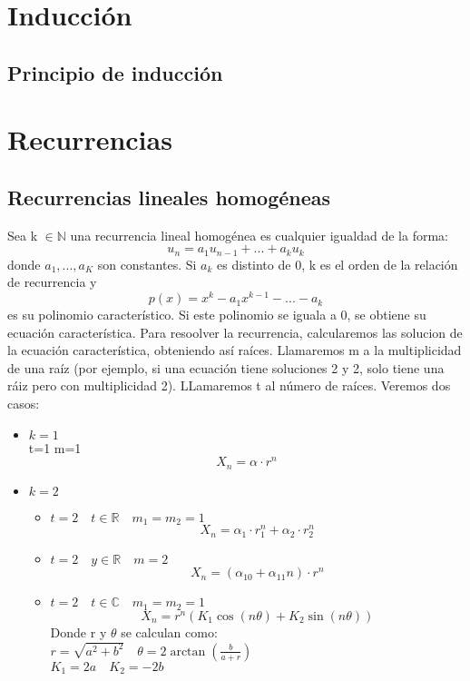 \documentclass[a4paper]{article}
\title {\fbox{\Huge{\textbf{Resumen de lógica}}}}
\author {\fbox{Mapachana}}
\begin{document}
\maketitle


\section{Inducción}
\subsection{Principio de inducción}

\section{Recurrencias}
\subsection{Recurrencias lineales homogéneas}
\large{Sea} k $\in \mathbb{N}$ una recurrencia lineal homogénea es cualquier igualdad de la forma:
$$u_n=a_1u_{n-1}+...+a_ku_k$$
donde $a_1,...,a_K$ son constantes. Si $a_k$ es distinto de 0, k es el orden de la relación de recurrencia y
$$p(x)=x^k-a_1x^{k-1}-...-a_k$$
es su polinomio característico. Si este polinomio se iguala a 0, se obtiene su ecuación característica.
Para resoolver la recurrencia, calcularemos las solucion de la ecuación característica, obteniendo así raíces. Llamaremos m a la multiplicidad de una raíz (por ejemplo, si una ecuación tiene soluciones 2 y 2, solo tiene una ráiz pero con multiplicidad 2). LLamaremos t al número de raíces.
Veremos dos casos:
\begin{itemize}
\item $k=1$\\
t=1 m=1
$$X_n=\alpha\cdot r^n$$
\item $k=2$
\begin{itemize}
\item $t=2 \quad t\in\mathbb{R} \quad m_1=m_2=1$
$$X_n=\alpha_1\cdot r_1^n+\alpha_2\cdot r_2^n$$
\item $t=2 \quad y\in\mathbb{R} \quad m=2$
$$X_n=(\alpha_{10}+\alpha_{11}n)\cdot r^n$$
\item $t=2 \quad t\in\mathbb{C} \quad m_1=m_2=1$
$$X_n=r^n\left(K_1\cos(n\theta) + K_2\sin(n\theta)\right)$$
Donde r y $\theta$ se calculan como:\\
$r=\sqrt{a^2+b^2} \quad \theta=2\arctan(\frac{b}{a+r})$\\
$K_1=2a \quad K_2=-2b$
\end{itemize}
\end{itemize}
\end{document}
